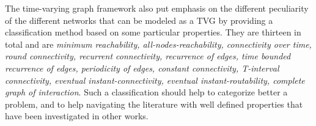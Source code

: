 	The time-varying graph framework also put emphasis on the different peculiarity of the different networks that can be modeled as a TVG by providing a classification method based on some particular properties. They are thirteen in total and are \textit{minimum reachability, all-nodes-reachability, connectivity over time, round connectivity, recurrent connectivity, recurrence of edges, time bounded recurrence of edges, periodicity of edges, constant connectivity, T-interval connectivity, eventual instant-connectivity, eventual instant-routability, complete graph of interaction}.
	Such a classification should help to categorize better a problem, and to help navigating the literature with well defined properties that have been investigated in other works.
